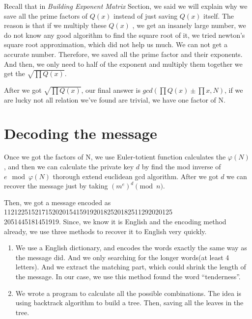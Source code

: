 \documentclass[12pt]{article} %
\begin{document}
\begin{enumerate}
Recall that in \textit{Building Exponent Matrix} Section, we said we will explain why we save all the prime factors of $Q(x)$ instead of just saving $Q(x)$ itself. The reason is that if we multiply these $Q(x)$ , we get an insanely large number, we do not know any good algorithm to find the square root of it, we tried newton's square root approximation, which did not help us much. We can not get a accurate number. Therefore, we saved all the prime factor and their exponents. And then, we only need to half of the exponent and multiply them together we get the $\sqrt{\prod Q(x)}$. 

After we got $\sqrt{\prod Q(x)}$, our final answer is $gcd\left(\prod Q(x) \pm \prod x, N\right)$, if we are lucky not all relation we've found are trivial, we have one factor of N.

\end{enumerate}

\section {Decoding the message}

Once we got the factors of N, we use Euler-totient function calculates the $\varphi(N)$, and then we can calculate the private key $d$ by find the mod inverse of $e \mod{\varphi(N)}$ thorough extend euclidean gcd algorithm. After we got $d$ we can recover the message just by taking $(m^e)^d \pmod{n}$. 

Then, we got a message encoded as 1121225152171520201541591920182520182511292020125\\2051445181451919. Since, we know it is English and the encoding method already, we use three methods to recover it to English very quickly. 
\renewcommand\labelenumi{\arabic{enumi}.}
\begin{enumerate}
\item We use a English dictionary, and encodes the words exactly the same way as the message did. And we only searching for the longer words(at least 4 letters). And we extract the matching part, which could shrink the length of the message. In our case, we use this method found the word ``tenderness''.

\item We wrote a program to calculate all the possible combinations. The idea is using backtrack algorithm to build a tree. Then, saving all the leaves in the tree. 
\end{enumerate}
\end{document}

